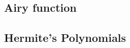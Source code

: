 
\subsection{Airy function}
\label{Subsection: Airy Asymptotic}


 \subsection{Hermite's Polynomials}

